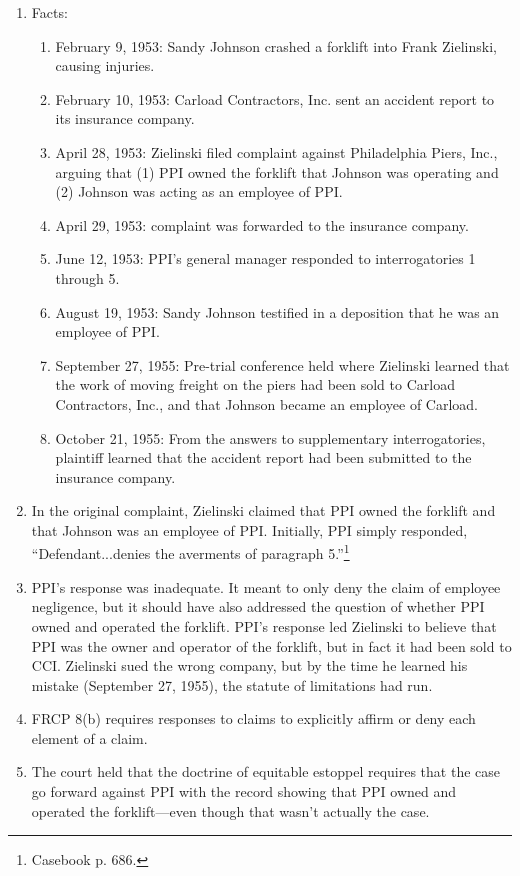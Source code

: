 \begin{enumerate}
    \item Facts:
    \begin{enumerate}
        \item February 9, 1953: Sandy Johnson crashed a forklift into Frank Zielinski, causing injuries.
        \item February 10, 1953: Carload Contractors, Inc. sent an accident report to its insurance company.
        \item April 28, 1953: Zielinski filed complaint against Philadelphia Piers, Inc., arguing that (1) PPI owned the forklift that Johnson was operating and (2) Johnson was acting as an employee of PPI.
        \item April 29, 1953: complaint was forwarded to the insurance company.
        \item June 12, 1953: PPI's general manager responded to interrogatories 1 through 5.
        \item August 19, 1953: Sandy Johnson testified in a deposition that he was an employee of PPI.
        \item September 27, 1955: Pre-trial conference held where Zielinski learned that the work of moving freight on the piers had been sold to Carload Contractors, Inc., and that Johnson became an employee of Carload.
        \item October 21, 1955: From the answers to supplementary interrogatories, plaintiff learned that the accident report had been submitted to the insurance company.
    \end{enumerate}
    \item In the original complaint, Zielinski claimed that PPI owned the forklift and that Johnson was an employee of PPI. Initially, PPI simply responded, ``Defendant...denies the averments of paragraph 5.''\footnote{Casebook p. 686.}
    \item PPI's response was inadequate. It meant to only deny the claim of employee negligence, but it should have also addressed the question of whether PPI owned and operated the forklift. PPI's response led Zielinski to believe that PPI was the owner and operator of the forklift, but in fact it had been sold to CCI. Zielinski sued the wrong company, but by the time he learned his mistake (September 27, 1955), the statute of limitations had run.
    \item FRCP 8(b) requires responses to claims to explicitly affirm or deny each element of a claim.
    \item The court held that the doctrine of equitable estoppel requires that the case go forward against PPI with the record showing that PPI owned and operated the forklift---even though that wasn't actually the case.
\end{enumerate}

